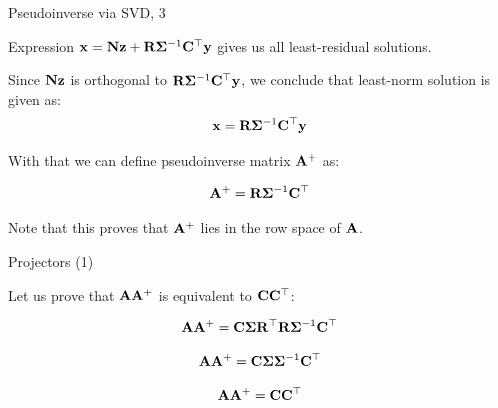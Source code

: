 \documentclass{beamer}
\begin{document}
\begin{frame}{Pseudoinverse via SVD, 3}
	\begin{flushleft}
		
		Expression $\mathbf{x} = \mathbf{N}\mathbf{z} + \mathbf{R}\mathbf{\Sigma}^{-1} \mathbf{C}^\top  \mathbf{y}$ gives us all least-residual solutions.
		
		\bigskip
		
		Since $\mathbf{N}\mathbf{z}$ is orthogonal to $\mathbf{R}\mathbf{\Sigma}^{-1} \mathbf{C}^\top  \mathbf{y}$, we conclude that least-norm solution is given as:
		\begin{align}
			\mathbf{x} = \mathbf{R}\mathbf{\Sigma}^{-1} \mathbf{C}^\top  \mathbf{y}
		\end{align}
		
		With that we can define pseudoinverse matrix $\mathbf{A}^+$ as:
		
		\begin{equation}
			\mathbf{A}^+ = 
			\mathbf{R} \mathbf{\Sigma}^{-1} \mathbf{C}^\top
		\end{equation}		
		
		Note that this proves that $\mathbf{A}^+$ lies in the row space of $\mathbf{A}$.
		
	\end{flushleft}
\end{frame}








\begin{frame}{Projectors (1)}
	\begin{flushleft}
		
		Let us prove that $\mathbf{A}\mathbf{A}^+$ is equivalent to $\mathbf{C}\mathbf{C}^\top$:
		
		\begin{equation}
			\mathbf{A} \mathbf{A}^+ = 
			\mathbf{C} \mathbf{\Sigma} \mathbf{R}^\top 
			\mathbf{R} \mathbf{\Sigma}^{-1} \mathbf{C}^\top
		\end{equation}
		
		
		\begin{equation}
			\mathbf{A} \mathbf{A}^+ = 
			\mathbf{C} \mathbf{\Sigma} \mathbf{\Sigma}^{-1} \mathbf{C}^\top
		\end{equation}
		
		\begin{equation}
			\mathbf{A} \mathbf{A}^+ = 
			\mathbf{C} \mathbf{C}^\top
		\end{equation}
		
		
	\end{flushleft}
\end{frame}
\end{document}
